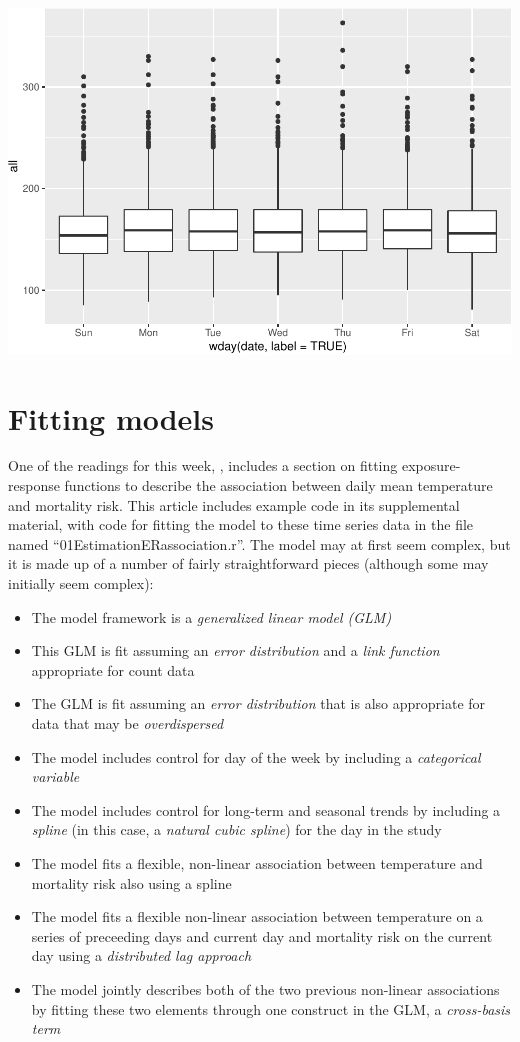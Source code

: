 \documentclass[
]{book}
\providecommand{\tightlist}{%
  \setlength{\itemsep}{0pt}\setlength{\parskip}{0pt}}
\begin{document}
\includegraphics{adv_epi_analysis_files/figure-latex/unnamed-chunk-20-1.pdf}

\hypertarget{fitting-models}{%
\section{Fitting models}\label{fitting-models}}

One of the readings for this week, \citet{vicedo2019hands}, includes a section
on fitting exposure-response functions to describe the association between
daily mean temperature and mortality risk. This article includes example
code in its supplemental material, with code for fitting the model to
these time series data in the file named ``01EstimationERassociation.r''.
The model may at first seem complex, but it is made up of a number of
fairly straightforward pieces (although some may initially seem complex):

\begin{itemize}
\tightlist
\item
  The model framework is a \emph{generalized linear model (GLM)}
\item
  This GLM is fit assuming an \emph{error distribution} and a \emph{link function}
  appropriate for count data
\item
  The GLM is fit assuming an \emph{error distribution} that is also appropriate for
  data that may be \emph{overdispersed}
\item
  The model includes control for day of the week by including a \emph{categorical
  variable}
\item
  The model includes control for long-term and seasonal trends by including
  a \emph{spline} (in this case, a \emph{natural cubic spline}) for the day in the study
\item
  The model fits a flexible, non-linear association between temperature
  and mortality risk also using a spline
\item
  The model fits a flexible non-linear association between temperature on
  a series of preceeding days and current day and mortality risk on the
  current day using a \emph{distributed lag approach}
\item
  The model jointly describes both of the two previous non-linear associations
  by fitting these two elements through one construct in the GLM, a
  \emph{cross-basis term}
\end{itemize}
\end{document}
